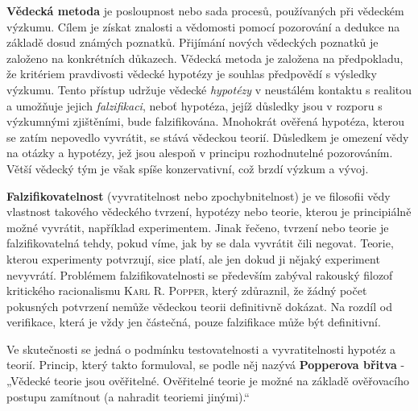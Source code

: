       \begin{tcnote}
        \textbf{Vědecká metoda} je posloupnost nebo sada procesů, používaných při vědeckém výzkumu.
        Cílem je získat znalosti a vědomosti pomocí pozorování a dedukce na základě dosud známých
        poznatků. Přijímání nových vědeckých poznatků je založeno na konkrétních důkazech. Vědecká
        metoda je založena na předpokladu, že kritériem pravdivosti vědecké hypotézy je souhlas
        předpovědí s výsledky výzkumu. Tento přístup udržuje vědecké \emph{hypotézy} v neustálém
        kontaktu s realitou a umožňuje jejich \emph{falzifikaci}, neboť hypotéza, jejíž důsledky
        jsou v rozporu s výzkumnými zjištěními, bude falzifikována. Mnohokrát ověřená hypotéza,
        kterou se zatím nepovedlo vyvrátit, se stává vědeckou teorií. Důsledkem je omezení vědy na
        otázky a hypotézy, jež jsou alespoň v principu rozhodnutelné pozorováním. Větší vědecký tým
        je však spíše konzervativní, což brzdí výzkum a vývoj.

        {\centering
        \captionsetup{type=figure}
        \label{fyz:fig0950}
        \par}

        \textbf{Falzifikovatelnost} (vyvratitelnost nebo zpochybnitelnost) je ve filosofii vědy
        vlastnost takového vědeckého tvrzení, hypotézy nebo teorie, kterou je principiálně možné
        vyvrátit, například experimentem. Jinak řečeno, tvrzení nebo teorie je falzifikovatelná
        tehdy, pokud víme, jak by se dala vyvrátit čili negovat. Teorie, kterou experimenty
        potvrzují, sice platí, ale jen dokud ji nějaký experiment nevyvrátí. Problémem
        falzifikovatelnosti se především zabýval rakouský filozof kritického racionalismu
        \textsc{Karl R. Popper}, který zdůraznil, že žádný počet pokusných potvrzení nemůže vědeckou
        teorii definitivně dokázat. Na rozdíl od verifikace, která je vždy jen částečná, pouze
        falzifikace může být definitivní.

        Ve skutečnosti se jedná o podmínku testovatelnosti a vyvratitelnosti hypotéz a teorií.
        Princip, který takto formuloval, se podle něj nazývá \textbf{Popperova břitva} - „Vědecké
        teorie jsou ověřitelné. Ověřitelné teorie je možné na základě ověřovacího postupu zamítnout
        (a nahradit teoriemi jinými).“


\end{tcnote}
